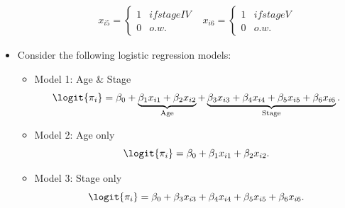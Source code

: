 \documentclass{article}\usepackage[]{graphicx}\usepackage[svgnames]{xcolor}
\begin{document}
\begin{itemize}
\begin{itemize}
\[\begin{array}{ll}
                            x_{i5}  = \begin{cases*}
                                          1 & if stage IV \\
                                          0 & o.w.
                                      \end{cases*} &
                            x_{i6}  = \begin{cases*}
                                          1 & if stage V \\
                                          0 & o.w.
                                      \end{cases*}
                        \end{array} \]
          \end{itemize}
    \item Consider the following logistic regression models:
          \begin{itemize}
              \item Model 1: Age \& Stage
                    \[ \logit{\pi_i}=\beta_0+\underbrace{\beta_1x_{i1}+\beta_2x_{i2}}_{\text{Age}}+\underbrace{\beta_3x_{i3}+\beta_4x_{i4}+\beta_5x_{i5}+\beta_6x_{i6}}_{\text{Stage}}. \]
              \item Model 2: Age only
                    \[ \logit{\pi_i}=\beta_0+\beta_1x_{i1}+\beta_2x_{i2}. \]
              \item Model 3: Stage only
                    \[ \logit{\pi_i}=\beta_0+\beta_3x_{i3}+\beta_4x_{i4}+\beta_5x_{i5}+\beta_6x_{i6}. \]
          \end{itemize}
\end{itemize}
\end{document}

